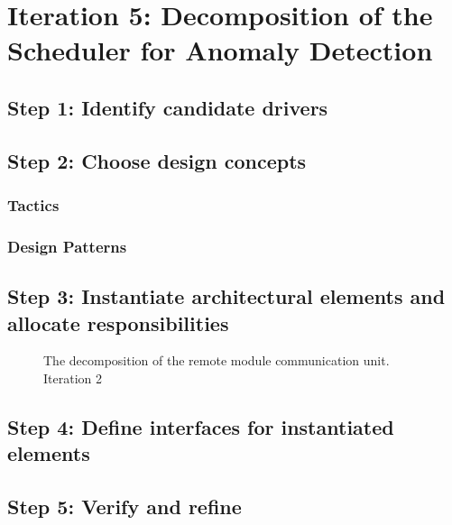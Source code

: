 \section{Iteration 5: Decomposition of the Scheduler for Anomaly Detection}
\label{add:it5}

\subsection{Step 1: Identify candidate drivers}
\label{add:it5/drivers}

\subsection{Step 2: Choose design concepts}
\label{add:it5/concepts}

\subsubsection{Tactics}
\label{add:it5/tactics}

\subsubsection{Design Patterns}
\label{add:it5/patterns}

\subsection{Step 3: Instantiate architectural elements and allocate responsibilities}
\label{add:it5/elements}

\begin{figure}[H]
	\begin{centering}
		\caption{The decomposition of the remote module communication unit. Iteration
		2}
		\label{fig:add/it5/decomposition}
	\end{centering}
\end{figure}

\subsection{Step 4: Define interfaces for instantiated elements}
\label{add:it5/interfaces}

\subsection{Step 5: Verify and refine}
\label{add:it5/verification}